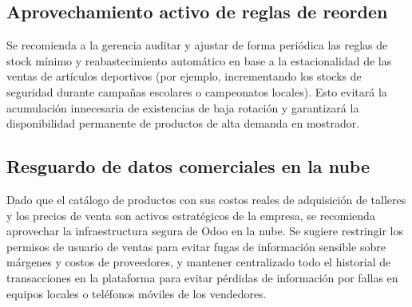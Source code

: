 \subsection{Aprovechamiento activo de reglas de reorden}
\begin{indentedsubsection}
Se recomienda a la gerencia auditar y ajustar de forma periódica las reglas de stock mínimo y reabastecimiento automático en base a la estacionalidad de las ventas de artículos deportivos (por ejemplo, incrementando los stocks de seguridad durante campañas escolares o campeonatos locales). Esto evitará la acumulación innecesaria de existencias de baja rotación y garantizará la disponibilidad permanente de productos de alta demanda en mostrador.
\end{indentedsubsection}

\subsection{Resguardo de datos comerciales en la nube}
\begin{indentedsubsection}
Dado que el catálogo de productos con sus costos reales de adquisición de talleres y los precios de venta son activos estratégicos de la empresa, se recomienda aprovechar la infraestructura segura de Odoo en la nube. Se sugiere restringir los permisos de usuario de ventas para evitar fugas de información sensible sobre márgenes y costos de proveedores, y mantener centralizado todo el historial de transacciones en la plataforma para evitar pérdidas de información por fallas en equipos locales o teléfonos móviles de los vendedores.
\end{indentedsubsection}
